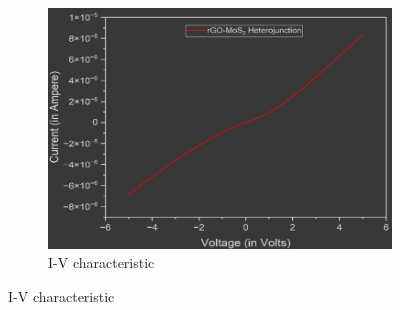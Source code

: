 \documentclass[11pt,a5paper]{article}
\begin{document}
\begin{figure}[t]
\begin{subfigure}[b]{0.325\textwidth}
        \includegraphics[width=\linewidth]{elec_char.png}
        \caption{I-V characteristic}
    \end{subfigure}

    \vspace{0.5cm}


\end{figure}
\end{document}
